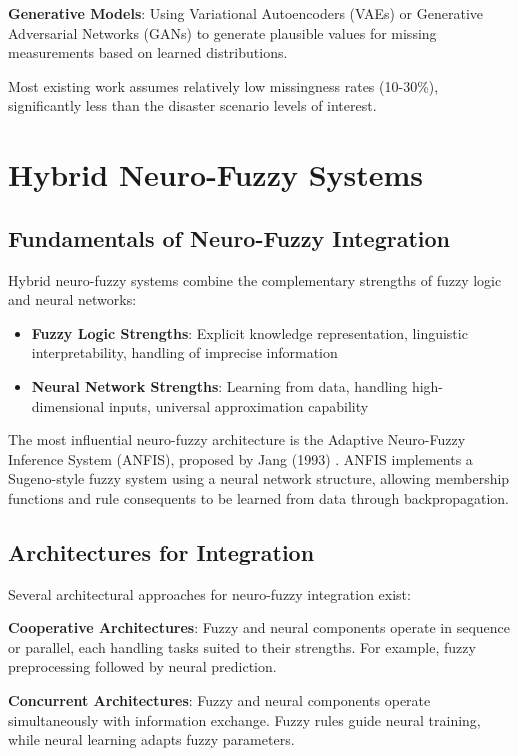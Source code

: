 \documentclass[12pt,a4paper]{report}
\begin{document}
\textbf{Generative Models}: Using Variational Autoencoders (VAEs) or Generative Adversarial Networks (GANs) to generate plausible values for missing measurements based on learned distributions.

Most existing work assumes relatively low missingness rates (10-30\%), significantly less than the disaster scenario levels of interest.

\section{Hybrid Neuro-Fuzzy Systems}

\subsection{Fundamentals of Neuro-Fuzzy Integration}

Hybrid neuro-fuzzy systems combine the complementary strengths of fuzzy logic and neural networks:

\begin{itemize}
    \item \textbf{Fuzzy Logic Strengths}: Explicit knowledge representation, linguistic interpretability, handling of imprecise information
    \item \textbf{Neural Network Strengths}: Learning from data, handling high-dimensional inputs, universal approximation capability
\end{itemize}

The most influential neuro-fuzzy architecture is the Adaptive Neuro-Fuzzy Inference System (ANFIS), proposed by Jang (1993) \cite{jang1993}. ANFIS implements a Sugeno-style fuzzy system using a neural network structure, allowing membership functions and rule consequents to be learned from data through backpropagation.

\subsection{Architectures for Integration}

Several architectural approaches for neuro-fuzzy integration exist:

\textbf{Cooperative Architectures}: Fuzzy and neural components operate in sequence or parallel, each handling tasks suited to their strengths. For example, fuzzy preprocessing followed by neural prediction.

\textbf{Concurrent Architectures}: Fuzzy and neural components operate simultaneously with information exchange. Fuzzy rules guide neural training, while neural learning adapts fuzzy parameters.
\end{document}
